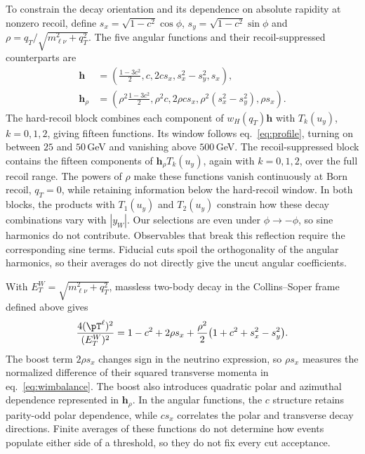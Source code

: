 To constrain the decay orientation and its dependence on absolute rapidity at nonzero recoil, define $s_x=\sqrt{1-c^2}\cos\phi$, $s_y=\sqrt{1-c^2}\sin\phi$ and $\rho=q_T/\sqrt{m_{\ell\nu}^2+q_T^2}$. The five angular functions and their recoil-suppressed counterparts are
\begin{equation}
\begin{aligned}
\boldsymbol h&=\left(\frac{1-3c^2}{2},c,2cs_x,s_x^2-s_y^2,s_x\right),\\
\boldsymbol h_\rho&=\left(\rho^2\frac{1-3c^2}{2},\rho^2c,
2\rho cs_x,\rho^2(s_x^2-s_y^2),\rho s_x\right).
\end{aligned}
\label{eq:wspin}
\end{equation}
The hard-recoil block combines each component of $w_H(q_T)\boldsymbol h$ with $T_k(u_y)$, $k=0,1,2$, giving fifteen functions. Its window follows eq.~\eqref{eq:profile}, turning on between $25$ and $50\,$GeV and vanishing above $500\,$GeV. The recoil-suppressed block contains the fifteen components of $\boldsymbol h_\rho T_k(u_y)$, again with $k=0,1,2$, over the full recoil range. The powers of $\rho$ make these functions vanish continuously at Born recoil, $q_T=0$, while retaining information below the hard-recoil window. In both blocks, the products with $T_1(u_y)$ and $T_2(u_y)$ constrain how these decay combinations vary with $|y_W|$. Our selections are even under $\phi\to-\phi$, so sine harmonics do not contribute. Observables that break this reflection require the corresponding sine terms. Fiducial cuts spoil the orthogonality of the angular harmonics, so their averages do not directly give the uncut angular coefficients.

With $E_T^W=\sqrt{m_{\ell\nu}^2+q_T^2}$, massless two-body decay in the Collins--Soper frame defined above gives
\begin{equation}
\frac{4(\pT^\ell)^2}{(E_T^W)^2}
=1-c^2+2\rho s_x+\frac{\rho^2}{2}
\big(1+c^2+s_x^2-s_y^2\big).
\label{eq:wptkinematics}
\end{equation}
The boost term $2\rho s_x$ changes sign in the neutrino expression, so $\rho s_x$ measures the normalized difference of their squared transverse momenta in eq.~\eqref{eq:wimbalance}. The boost also introduces quadratic polar and azimuthal dependence represented in $\boldsymbol h_\rho$. In the angular functions, the $c$ structure retains parity-odd polar dependence, while $cs_x$ correlates the polar and transverse decay directions. Finite averages of these functions do not determine how events populate either side of a threshold, so they do not fix every cut acceptance.

